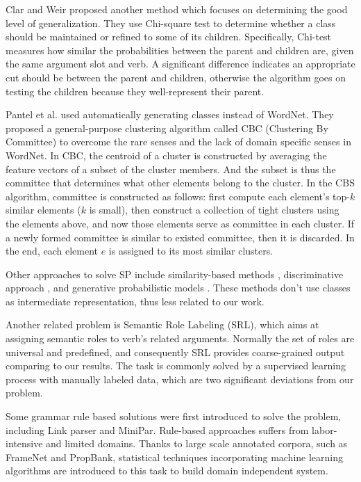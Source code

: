 Clar and Weir\cite{clark2001class} proposed another method
which focuses on determining the good level of generalization.
They use Chi-square test to determine whether a class should
be maintained or refined to some of its children. Specifically,
Chi-test measures how similar the probabilities between the parent
and children are, given the same argument slot and verb.
A significant difference indicates an appropriate cut should
be between the parent and children, otherwise the algorithm
goes on testing the children because they well-represent their parent.

Pantel et al.\cite{pantel2003clustering} used
automatically generating classes instead of WordNet.
They proposed a general-purpose clustering algorithm called
CBC (Clustering By Committee) to overcome the rare senses and the
lack of domain specific senses in WordNet.
In CBC, the centroid of a cluster is constructed by
averaging the feature vectors of a subset of the cluster members.
And the subset is thus the committee that determines what
other elements belong to the cluster. In the CBS algorithm,
committee is constructed as follows: first compute each element's
top-$k$ similar elements ($k$ is small), then construct
a collection of tight clusters using the elements above,
and now those elements serve as committee in each cluster.
If a newly formed committee is similar to existed committee,
then it is discarded. In the end, each element $e$ is
assigned to its most similar clusters.

Other approaches to solve SP include
similarity-based methods \cite{dagan1999similarity, erk2007simple},
discriminative approach \cite{bergsma2008discriminative},
and generative probabilistic models \cite{rooth1999inducing,
ritter2010latent, seaghdha2010latent}.
These methods don't use classes as intermediate representation,
thus less related to our work.

Another related problem is Semantic Role Labeling (SRL), which aims at
assigning semantic roles to verb's related arguments.
Normally the set of roles are universal and predefined,
and consequently SRL provides coarse-grained output comparing
to our results. The task is commonly solved
by a supervised learning process with manually labeled data,
which are two significant deviations from our problem.

Some grammar rule based solutions were first introduced to solve
the problem, including Link parser\cite{sleator1995parsing} and
MiniPar\cite{lin1994principar}. Rule-based approaches suffers from
labor-intensive and limited domains. Thanks to large scale annotated
corpora, such as FrameNet\cite{baker1998berkeley}
and PropBank\cite{kingsbury2002treebank}, statistical techniques
incorporating machine learning algorithms
\cite{gildea2002automatic,pradhan2004shallow,pradhan2005semantic,
marquez2008semantic} are introduced to this task
to build domain independent system.

